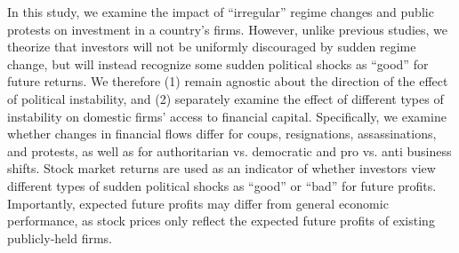 \documentclass[12pt,final,fleqn]{article}
\theoremstyle{plain}
\begin{document}

In this study, we examine the impact of ``irregular'' regime changes and public protests on investment in a country's firms. However, unlike previous studies, we theorize that investors will not be uniformly discouraged by sudden regime change, but will instead recognize some sudden political shocks as ``good'' for future returns. We therefore (1) remain agnostic about the direction of the effect of political instability, and (2) separately examine the effect of different types of instability on domestic firms' access to financial capital. Specifically, we examine whether changes in financial flows differ for coups, resignations, assassinations, and protests, as well as for authoritarian vs. democratic and pro vs. anti business shifts. Stock market returns are used as an indicator of whether investors view different types of sudden political shocks as ``good'' or ``bad'' for future profits. Importantly, expected future profits may differ from general economic performance, as stock prices only reflect the expected future profits of existing publicly-held firms.

\end{document}
